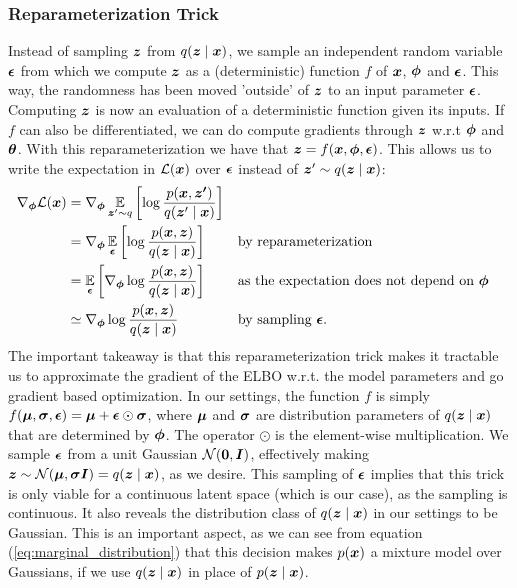 \subsubsection{Reparameterization Trick}
Instead of sampling $\bm{ z }$ from $q(\bm{ z } \mid \bm{ x })$, we sample an independent random variable $\bm{ \epsilon }$ from which we compute $\bm{ z }$ as a (deterministic) function $f$ of $\bm{ x }$, $\bm{ \phi }$ and $\bm{ \epsilon }$. This way, the randomness has been moved 'outside' of $\bm{ z }$ to an input parameter $\bm{ \epsilon }$. Computing $\bm{ z }$ is now an evaluation of a deterministic function given its inputs. If $f$ can also be differentiated, we can do compute gradients through $\bm{ z }$ w.r.t $\bm{ \phi }$ and $\bm{ \theta }$. With this reparameterization we have that $\bm{ z } = f(\bm{ x }, \bm{ \phi }, \bm{ \epsilon })$. This allows us to write the expectation in $\mathcal{L}(\bm{ x })$ over $\bm{ \epsilon }$ instead of $\bm{ z }' \sim q(\bm{ z } \mid \bm{ x })$:
\begin{align*}
\nabla_{\bm{ \phi }}\mathcal{L}(\bm{ x }) &= \nabla_{\bm{ \phi }} \operatorname*{\mathbb{E}}_{\bm{ z }'\sim q}{\mathopen{} \left[ \log \frac{p(\bm{ x }, \bm{ z' })}{q(\bm{ z }' \mid \bm{ x })} \right] \mathclose{}}\\
&= \nabla_{\bm{ \phi }} \operatorname*{\mathbb{E}}_{\bm{ \epsilon }}{\mathopen{} \left[ \log \frac{p(\bm{ x }, \bm{ z })}{q(\bm{ z } \mid \bm{ x })} \right] \mathclose{}} &&\text{by reparameterization}\\
&= \operatorname*{\mathbb{E}}_{\bm{ \epsilon }}{\mathopen{} \left[ \nabla_{\bm{ \phi }} \log \frac{p(\bm{ x }, \bm{ z })}{q(\bm{ z } \mid \bm{ x })} \right] \mathclose{}} &&\text{as the expectation does not depend on $\bm{ \phi }$}\\
&\simeq \nabla_{\bm{ \phi }} \log \frac{p(\bm{ x }, \bm{ z })}{q(\bm{ z } \mid \bm{ x })} &&\text{by sampling $\bm{ \epsilon }$.}
\end{align*}
The important takeaway is that this reparameterization trick makes it tractable us to approximate the gradient of the ELBO w.r.t. the model parameters and go gradient based optimization. In our settings, the function $f$ is simply $f(\bm{ \mu }, \bm{ \sigma }, \bm{ \epsilon }) = \bm{ \mu } + \bm{ \epsilon } \odot \bm{ \sigma }$, where $\bm{ \mu }$ and $\bm{ \sigma }$ are distribution parameters of $q(\bm{ z } \mid \bm{ x })$ that are determined by $\bm{ \phi }$. The operator $\odot$ is the element-wise multiplication. We sample $\bm{ \epsilon }$ from a unit Gaussian $\mathcal{N}{\mathopen{} \left( \bm{ 0 }, \bm{ I } \right) \mathclose{}}$, effectively making $\bm{ z } \sim \mathcal{N}{\mathopen{} \left( \bm{ \mu }, \bm{ \sigma I } \right) \mathclose{}} = q(\bm{ z } \mid \bm{ x })$, as we desire. This sampling of $\bm{ \epsilon }$ implies that this trick is only viable for a continuous latent space (which is our case), as the sampling is continuous. It also reveals the distribution class of $q(\bm{ z } \mid \bm{ x })$ in our settings to be Gaussian. This is an important aspect, as we can see from equation (\ref{eq:marginal_distribution}) that this decision makes $p(\bm{ x })$ a mixture model over Gaussians, if we use $q(\bm{ z } \mid \bm{ x })$ in place of $p(\bm{ z } \mid \bm{ x })$.

